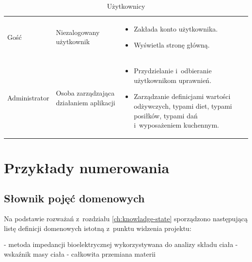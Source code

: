 \begin{minipage}{\textwidth}
    \begin{table}[H]
        \raggedright\caption{Użytkownicy\label{tabela:uzytkownicy}}
        \begin{center}\begin{tabular}{|P{.15\textwidth}|P{.25\textwidth}|P{.5\textwidth}|}

            \hline
             &  & \\

            \hline
            Gość &
            Niezalogowany użytkownik &
            \begin{itemize}
                \item Zakłada konto użytkownika.
                \item Wyświetla stronę główną.
            \end{itemize} \\
            \hline
            Administrator &
            Osoba zarządzająca działaniem aplikacji &
            \begin{itemize}
                \item Przydzielanie i~odbieranie użytkownikom uprawnień.
                \item Zarządzanie definicjami wartości odżywczych, typami diet, typami posiłków, typami dań i~wyposażeniem kuchennym.
            \end{itemize} \\
            \hline
        \end{tabular}\end{center}
        \raggedright\source{\ownwork}
    \end{table}
\end{minipage}

\section{Przykłady numerowania}
\subsection{Słownik pojęć domenowych}\label{sec:dictionary}
Na podstawie rozważań z~rozdziału \ref{ch:knowladge-state} sporządzono następującą listę definicji domenowych istotną z~punktu widzenia projektu:
\begin{itemize}[series=atr, wide, align=left, leftmargin=190pt]
    - metoda impedancji bioelektrycznej wykorzystywana do analizy składu ciała
    - wskaźnik masy ciała
    - całkowita przemiana materii
\end{itemize}
